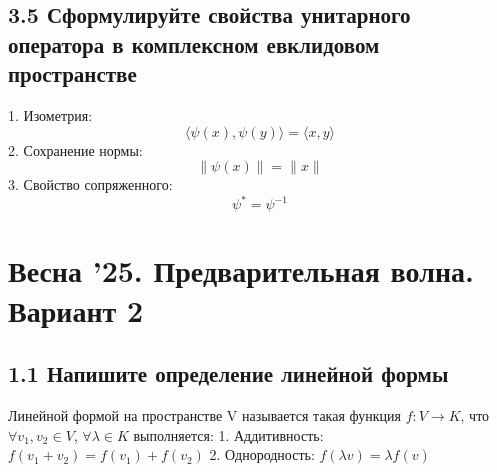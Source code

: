 \documentclass{article}
\begin{document}
\subsection*{3.5 Сформулируйте свойства унитарного оператора в комплексном евклидовом пространстве}
1. Изометрия:
\[\langle \psi(x), \psi(y) \rangle = \langle x, y \rangle\]
2. Сохранение нормы:
\[\|\psi(x)\| = \|x\|\]
3. Свойство сопряженного:
\[\psi^* = \psi^{-1}\]

\newpage

\section*{Весна '25. Предварительная волна. Вариант 2}

\subsection*{1.1 Напишите определение линейной формы}
Линейной формой на пространстве V называется такая функция \( f : V \rightarrow K \), что \(\forall v_1, v_2 \in V\), \(\forall \lambda \in K\) выполняется:
1. Аддитивность: \( f(v_1 + v_2) = f(v_1) + f(v_2) \)
2. Однородность: \( f(\lambda v) = \lambda f(v) \)
\end{document}
